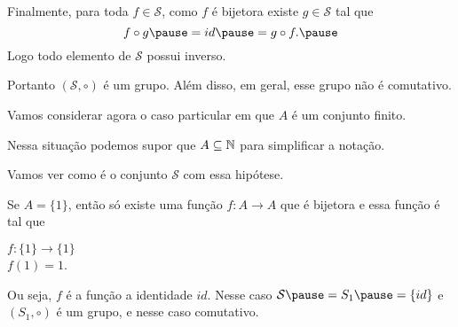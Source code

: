 \documentclass{beamer}
\begin{document}
    \begin{frame}

        Finalmente, \pause para toda $f \in \mathcal{S}$, \pause como $f$ \'e bijetora \pause existe $g \in \mathcal{S}$ \pause tal que \pause
        \[
            f\circ g \pause = id \pause = g \circ f. \pause
        \]
        Logo todo elemento de $\mathcal{S}$ \pause possui inverso. \pause

        \vspace{.3cm}

        Portanto $(\mathcal{S}, \circ)$ \pause \'e um grupo.  \pause Al\'em disso, em geral, esse grupo n\~ao \'e comutativo. \pause

        \vspace{.3cm}

        Vamos considerar agora o caso particular \pause em que $A$ \'e um conjunto finito. \pause

        \vspace{.3cm}

        Nessa situa\c{c}\~ao podemos supor que $A \subseteq \mathbb{N}$ \pause para simplificar a nota\c{c}\~ao. \pause

        \vspace{.3cm}

        Vamos ver como \'e o conjunto $\mathcal{S}$ com essa hip\'otese. \pause
    \end{frame}

    \begin{frame}
        Se $A = \{1\}$, \pause ent\~ao s\'o existe uma fun\c{c}\~ao $f : A \to A$ \pause que \'e bijetora e essa fun\c{c}\~ao \'e tal que \pause
        \begin{center}
            $f : \{1\} \to \{1\}$ \pause\\
            $f(1) = 1$. \pause
        \end{center}
        Ou seja, $f$ \'e a fun\c{c}\~ao a identidade $id$. \pause Nesse caso $\mathcal{S} \pause = S_1 \pause = \{id\}$ \pause e $(S_1, \circ)$ \'e um grupo, \pause e nesse caso comutativo. \pause
    \end{frame}
    
\end{document}
